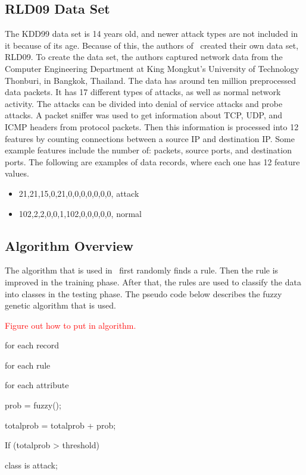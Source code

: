\documentclass{sig-alternate}
\newcommand{\mycomment}[1]{\textcolor{red}{#1}}
\begin{document}
\subsection{RLD09 Data Set}
The KDD99 data set is 14 years old, and newer attack types are not included in it because of its age. Because of this, the authors of~\cite{6496342, 6559603} created their own data set, RLD09. To create the data set, the authors captured network data from the Computer Engineering Department at King Mongkut's University of Technology Thonburi, in Bangkok, Thailand. The data has around ten million preprocessed data packets. It has 17 different types of attacks, as well as normal network activity. The attacks can be divided into denial of service attacks and probe attacks. A packet sniffer was used to get information about TCP, UDP, and ICMP headers from protocol packets. Then this information is processed into 12 features by counting connections between a source IP and destination IP. Some example features include the number of: packets, source ports, and destination ports. The following are examples of data records, where each one has 12 feature values.

\begin{itemize}
\item 21,21,15,0,21,0,0,0,0,0,0,0, attack
\item 102,2,2,0,0,1,102,0,0,0,0,0, normal
\end{itemize}




\subsection{Algorithm Overview}
The algorithm that is used in~\cite{6496342, 6559603} first randomly finds a rule. Then the rule is improved in the training phase. After that, the rules are used to classify the data into classes in the testing phase. The pseudo code below describes the fuzzy genetic algorithm that is used. 

\mycomment{Figure out how to put in algorithm.}

for each record

   for each rule

      for each attribute
         
         prob = fuzzy();

         totalprob = totalprob + prob;
      
      If (totalprob > threshold)

         class is attack;
\end{document}
